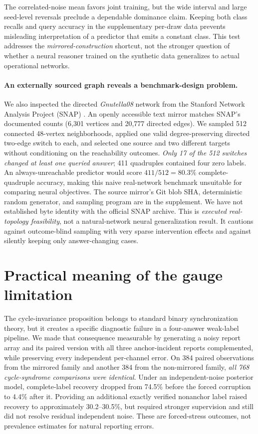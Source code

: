 \documentclass[10pt]{article}
\begin{document}
The correlated-noise mean favors joint training, but the wide interval and large seed-level reversals preclude a dependable dominance claim. Keeping both class recalls and query accuracy in the supplementary per-draw data prevents misleading interpretation of a predictor that emits a constant class. This test addresses the \emph{mirrored-construction} shortcut, not the stronger question of whether a neural reasoner trained on the synthetic data generalizes to actual operational networks.

\paragraph{An externally sourced graph reveals a benchmark-design problem.}
We also inspected the directed \emph{Gnutella08} network from the Stanford Network Analysis Project (SNAP) \cite{SNAPGnutella}. An openly accessible text mirror matches SNAP's documented counts (6,301 vertices and 20,777 directed edges). We sampled 512 connected 48-vertex neighborhoods, applied one valid degree-preserving directed two-edge switch to each, and selected one source and two different targets without conditioning on the reachability outcomes. \emph{Only 17 of the 512 switches changed at least one queried answer}; 411 quadruples contained four zero labels. An always-unreachable predictor would score $411/512=80.3\%$ complete-quadruple accuracy, making this naive real-network benchmark unsuitable for comparing neural objectives. The source mirror's Git blob SHA, deterministic random generator, and sampling program are in the supplement. We have not established byte identity with the official SNAP archive. This is \emph{executed real-topology feasibility}, not a natural-network neural generalization result. It cautions against outcome-blind sampling with very sparse intervention effects and against silently keeping only answer-changing cases.

\section{Practical meaning of the gauge limitation}
\label{sec:gaugepractical}
The cycle-invariance proposition belongs to standard binary synchronization theory, but it creates a specific diagnostic failure in a four-answer weak-label pipeline. We made that consequence measurable by generating a noisy report array and its paired version with all three anchor-incident reports complemented, while preserving every independent per-channel error. On 384 paired observations from the mirrored family and another 384 from the non-mirrored family, \emph{all 768 cycle-syndrome comparisons were identical}. Under an independent-noise posterior model, complete-label recovery dropped from 74.5\% before the forced corruption to 4.4\% after it. Providing an additional exactly verified nonanchor label raised recovery to approximately 30.2--30.5\%, but required stronger supervision and still did not resolve residual independent noise. These are forced-stress outcomes, not prevalence estimates for natural reporting errors.
\end{document}
